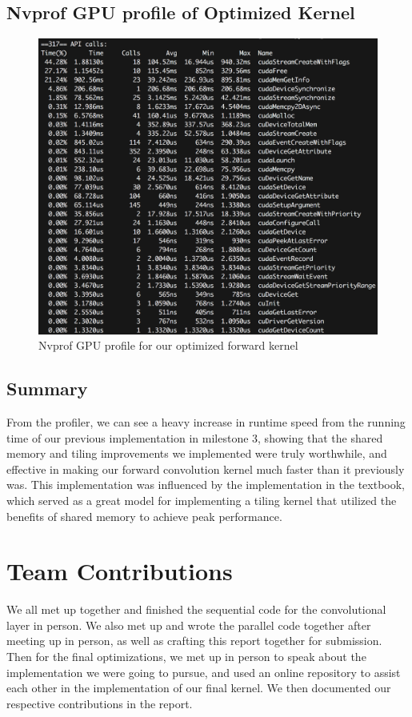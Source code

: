 \documentclass[titlepage]{article}
\begin{document}
\newpage

\subsection*{Nvprof GPU profile of Optimized Kernel}
\begin{figure}[h!]
\includegraphics[width=\linewidth]{rai2.png}
\caption{Nvprof GPU profile for our optimized forward kernel}
\label{fig:flowFree}
\end{figure}

\newpage
\subsection*{Summary}
\noindent
From the profiler, we can see a heavy increase in runtime speed from the running time of our previous implementation in milestone 3, showing that the shared memory and tiling improvements we implemented were truly worthwhile, and effective in making our forward convolution kernel much faster than it previously was. This implementation was influenced by the implementation in the textbook, which served as a great model for implementing a tiling kernel that utilized the benefits of shared memory to achieve peak performance.


\section*{Team Contributions}
We all met up together and finished the sequential code for the convolutional layer in person. We also met up and wrote the parallel code together after 
meeting up in person, as well as crafting this report together for submission. Then for the final optimizations, we met up in person to speak about the implementation we were going to pursue, and used an online repository to assist each other in the implementation of our final kernel. We then documented our respective contributions in the report.
\end{document}
